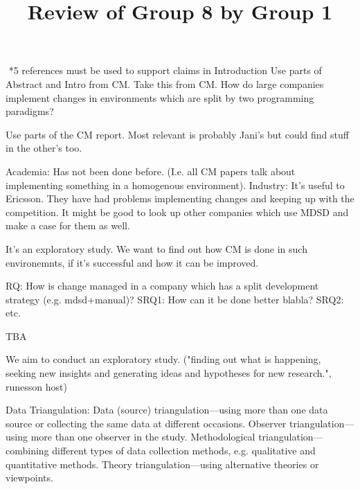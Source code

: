 \documentclass[times, 10pt,twocolumn]{IEEEtran}
\begin{document}
\title{Review of Group 8 by Group 1}

\author{


}


\maketitle
\thispagestyle{empty}







​
*5 references must be used to support claims in Introduction
Use parts of Abstract and Intro from CM. 
Take this from CM. 
How do large companies implement changes in environments which are split by two programming paradigms? 

Use parts of the CM report. 
Most relevant is probably Jani's but could find stuff in the other's too. 

Academia: Has not been done before. (I.e. all CM papers talk about implementing something in a homogenous environment). 
Industry: It's useful to Ericsson. They have had problems implementing changes and keeping up with the competition. It might be good to look up other companies which use MDSD and make a case for them as well. 

It's an exploratory study. We want to find out how CM is done in such environemnts, if it's successful and how it can be improved. 

RQ: How is change managed in a company which has a split development strategy (e.g. mdsd+manual)?
SRQ1: How can it be done better blabla?
SRQ2: etc. 

TBA

We aim to conduct an exploratory study. ("finding out what is happening, seeking new insights and generating ideas
and hypotheses for new research.", runesson host)

Data Triangulation:
Data (source) triangulation—using more than one data source or collecting the same
data at different occasions.
Observer triangulation—using more than one observer in the study.
Methodological triangulation—combining different types of data collection methods,
e.g. qualitative and quantitative methods.
Theory triangulation—using alternative theories or viewpoints.
\end{document}
